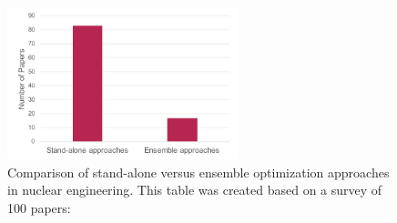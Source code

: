 \documentclass[12pt]{article}
\begin{document}
\begin{figure}
	\centering
	\includegraphics[width=0.6\textwidth]{methods2}
	\caption{Comparison of stand-alone versus ensemble optimization approaches in nuclear engineering. This table was created based on a survey of 100 papers: \cite{Haling:1964,Wall:1965,Sauar:1971,Miller:1975,Motoda:1975,Comes:1988,Okafor:1988,Stillman:1989,Burte:1993,Mahlers:1994,Smuc:1994,Feltus:1995,Stevens:1995,DeChaine:1996,Axmann:1997,Kim:1997,Mahlers:1997,Yamamoto:1997,Lin:1998,Chapot:1999,Francois:1999,Moore:1999,Toshinsky:1999,Karve:2000,Yamamoto:2000,Hongchun:2001,Jagawa:2001,Lee:2001,Kobayashi:2002,Machado:2002,Erdoan:2003,Faria:2003,Sadighi:2003,Yamamoto:2003,Alim:2004,Alim:2004a,Guler:2004,Ortiz:2004,Yamamoto:2004,Ziver:2004,Alim:2005,Francois:2005,Keller:2005,Do:2006,Wang:2006,Castillo:2007,Francois:2007,Hadavi:2007,Hernandez:2007,Keller:2007,Kim:2007,Lima:2007,Park:2007,Alim:2008,Fadaei:2008,Lima:2008,Park:2008,De-Moura-Meneses:2009,Waintraub:2009,Zerovnik:2009,De-Moura-Meneses:2010,Ishida:2010,Shaukat:2010,Zio:2010,Hays:2011,Kropaczek:2011,Norouzi:2011,Oliveira:2011,Ortiz-Servin:2011,Silva:2011,Silva:2011a,Tsvetkov:2011,Yadav:2011,Carlos:2012,Hays:2012,Lin:2012,Liu:2012,Aghaie:2013,Kropaczek:2013,Levine:2013,Wang:2013,Arshi:2014,Carlsen:2014,Hedayat:2014,Khoshahval:2014,Khoshahval:2014a,Lin:2014,Park:2014,Silva:2014,Zameer:2014,Camara-Augusto:2015,De-Moura-Meneses:2015,Hill:2015,Ottinger:2015,Park:2015,Poursalehi:2015,Su:2015,Ayoobian:2016,Hou:2016,Schlunz:2016}}
	\label{fig:method2}
\end{figure}
\end{document}
